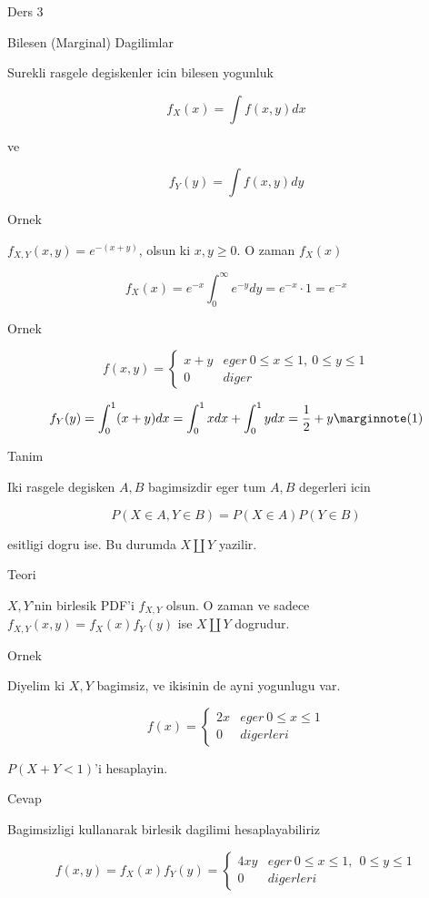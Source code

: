 \documentclass[12pt,fleqn]{article}\usepackage{../common}
\begin{document}
Ders 3

Bilesen (Marginal) Dagilimlar 

Surekli rasgele degiskenler icin bilesen yogunluk 

\[ f_X(x) = \int f(x,y) dx \]

ve

\[ f_Y(y) = \int f(x,y) dy \]

Ornek 

$f_{X,Y}(x,y) = e^{ -(x+y)}$, olsun ki $x,y \ge 0$. O zaman $f_X(x)$

\[ f_X(x) = e^{ -x} \int _{ 0}^{\infty} e^{ -y}dy = e^{ -x}  \cdot 1  = e^{-x} 
\]

Ornek 

\[ f(x,y) = 
\left\{ \begin{array}{ll}
x+y & eger \ 0 \le x \le 1, \ 0 \le y \le 1 \\
0 & diger
\end{array} \right.
 \]

\[ f_Y(y) = \int _{0}^{1}(x+y) dx = 
\int _{0}^{1}x dx + \int _{0}^{1}y dx  = 
\frac{ 1}{2} + y 
\mlabel{1}
 \]

Tanim 

Iki rasgele degisken $A,B$ bagimsizdir eger tum $A,B$ degerleri icin 

\[ P(X \in A, Y \in B) = P(X \in A)P(Y \in B) \]

esitligi dogru ise. Bu durumda $X \amalg Y$ yazilir.

Teori 

$X,Y$'nin birlesik PDF'i $f_{X,Y}$ olsun. O zaman ve sadece 
$f_{X,Y}(x,y) =
 f_X(x)f_Y(y)$ ise $X \amalg Y$ dogrudur. 

Ornek 

Diyelim ki $X,Y$ bagimsiz, ve ikisinin de ayni yogunlugu var.

\[ f(x) = 
\left\{ \begin{array}{ll}
2x & eger \ 0 \le x \le 1 \\
0 & digerleri
\end{array} \right.
 \]

$P(X+Y < 1)$'i hesaplayin. 

Cevap

Bagimsizligi kullanarak birlesik dagilimi hesaplayabiliriz

\[ f(x,y) = f_X(x)f_Y(y) = 
\left\{ \begin{array}{ll}
4xy & eger \ 0 \le x \le 1, \ \ 0 \le y \le 1 \\
0 & digerleri
\end{array} \right.
 \]
\end{document}
